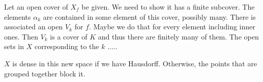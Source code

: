 \documentclass[12pt]{article}
\begin{document}
Let an open cover of $X_f$ be given. We need to show it has a finite subcover. The elements $\alpha_k$ are contained in some element of this cover, possibly many. There is associated an open $V_k$ for $f$. Maybe we do that for every element including inner ones. Then $V_k$ is a cover of $K$ and thus there are finitely many of them. The open sets in $X$ corresponding to the $k$ .....

$X$ is dense in this new space if we have Hausdorff. Otherwise, the points that are grouped together block it. 





\medskip

\normalem %
\printbibliography
\end{document}

